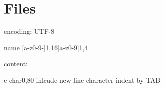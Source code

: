 \chapter{Files}
encoding: UTF-8

name [a-z0-9-]{1,16}\.[a-z0-9]{1,4}

content:

    c-char{0,80} inlcude new line character
    indent by TAB
